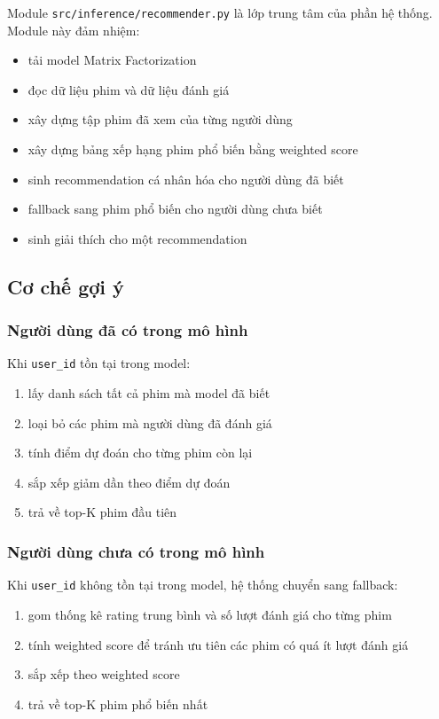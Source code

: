 \documentclass[12pt,a4paper]{article}
\begin{document}
Module \texttt{src/inference/recommender.py} là lớp trung tâm của phần hệ thống. Module này đảm nhiệm:

\begin{itemize}[leftmargin=1.5cm]
    \item tải model Matrix Factorization
    \item đọc dữ liệu phim và dữ liệu đánh giá
    \item xây dựng tập phim đã xem của từng người dùng
    \item xây dựng bảng xếp hạng phim phổ biến bằng weighted score
    \item sinh recommendation cá nhân hóa cho người dùng đã biết
    \item fallback sang phim phổ biến cho người dùng chưa biết
    \item sinh giải thích cho một recommendation
\end{itemize}

\subsection{Cơ chế gợi ý}

\subsubsection{Người dùng đã có trong mô hình}

Khi \texttt{user\_id} tồn tại trong model:

\begin{enumerate}[leftmargin=1.5cm]
    \item lấy danh sách tất cả phim mà model đã biết
    \item loại bỏ các phim mà người dùng đã đánh giá
    \item tính điểm dự đoán cho từng phim còn lại
    \item sắp xếp giảm dần theo điểm dự đoán
    \item trả về top-K phim đầu tiên
\end{enumerate}

\subsubsection{Người dùng chưa có trong mô hình}

Khi \texttt{user\_id} không tồn tại trong model, hệ thống chuyển sang fallback:

\begin{enumerate}[leftmargin=1.5cm]
    \item gom thống kê rating trung bình và số lượt đánh giá cho từng phim
    \item tính weighted score để tránh ưu tiên các phim có quá ít lượt đánh giá
    \item sắp xếp theo weighted score
    \item trả về top-K phim phổ biến nhất
\end{enumerate}
\end{document}
